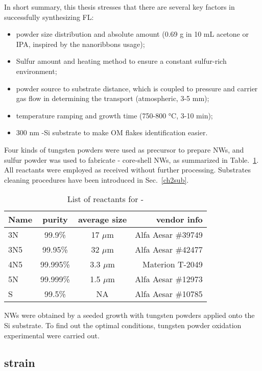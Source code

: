 In short summary, this thesis stresses that there are several key factors in successfully synthesizing  FL:
\begin{itemize}
\item {} powder size distribution and absolute amount (0.69 g  in 10 mL acetone or IPA, inspired by the  nanoribbons usage);
\item Sulfur amount and heating method to ensure a constant sulfur-rich environment;
\item {} powder source to substrate distance, which is coupled to pressure and carrier gas flow in determining the transport (atmospheric, 3-5 mm);
\item temperature ramping and growth time (750-800 \si{\degreeCelsius}, 3-10 min);
\item 300 nm -Si substrate to make OM flakes identification easier.
\end{itemize}

Four kinds of tungsten powders were used as precursor to prepare  NWs, and sulfur powder was used to fabricate - core-shell NWs, as summarized in Table.~\ref{tab:ch5pre}. All reactants were employed as received without further processing. Substrates cleaning procedures have been introduced in Sec.~\ref{ch2sub}. 

\begin{table}[htb]
\centering
\caption{List of reactants for -}\label{tab:ch5pre}
\begin{tabular}{lccr}
\toprule
Name & purity & average size & vendor info\\
\midrule
3N   &  99.9\% & 17 $\mu$m & Alfa Aesar \#39749\\
3N5   &  99.95\% & 32 $\mu$m  & Alfa Aesar \#42477\\
4N5   &  99.995\% & 3.3 $\mu$m  & Materion T-2049 \\
5N   &  99.999\% & 1.5 $\mu$m & Alfa Aesar \#12973\\
S    &   99.5\%  &  NA  & Alfa Aesar \#10785\\
\bottomrule
\end{tabular}
\end{table}

 NWs were obtained by a seeded growth with tungsten powders applied onto the Si substrate. To find out the optimal conditions, tungsten powder oxidation experimental were carried out. 


\subsection{strain}

